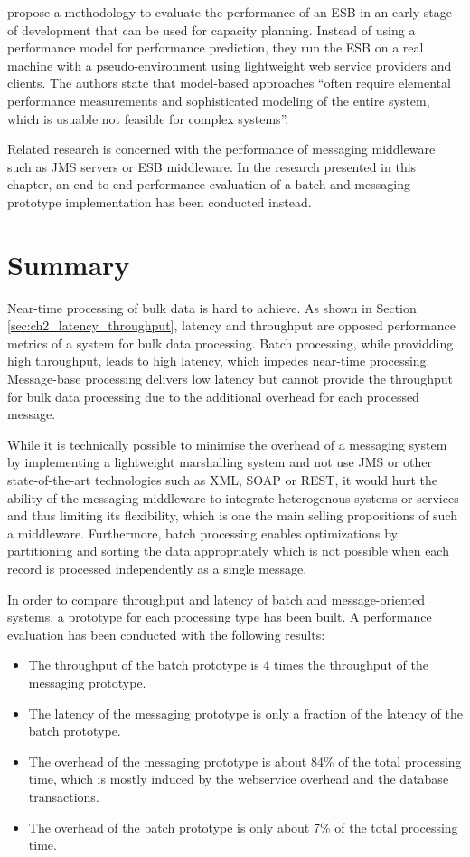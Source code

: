 \cite{Ueno:2006ly} propose a methodology to evaluate the performance of an ESB in an early stage of development that can be used for capacity planning. Instead of using a performance model for performance prediction, they run the ESB on a real machine with a pseudo-environment using lightweight web service providers and clients. The authors state that model-based approaches ``often require elemental performance measurements and sophisticated modeling of the entire system, which is usuable not feasible for complex systems''.

Related research is concerned with the performance of messaging middleware such as \ac{JMS} servers or \ac{ESB} middleware. In the research presented in this chapter, an end-to-end performance evaluation of a batch and messaging prototype implementation has been conducted instead.

\section{Summary}\label{sec:ch4_summary}
Near-time processing of bulk data is hard to achieve. As shown in Section \ref{sec:ch2_latency_throughput}, latency and throughput are opposed performance metrics of a system for bulk data processing. Batch processing, while providding high throughput, leads to high latency, which impedes near-time processing. Message-base processing delivers low latency but cannot provide the throughput for bulk data processing due to the additional overhead for each processed message.

While it is technically possible to minimise the overhead of a messaging system by implementing a lightweight marshalling system and not use JMS or other state-of-the-art technologies such as XML, SOAP or REST, it would hurt the ability of the messaging middleware to integrate heterogenous systems or services and thus limiting its flexibility, which is one the main selling propositions of such a middleware. Furthermore, batch processing enables optimizations by partitioning and sorting the data appropriately which is not possible when each record is processed independently as a single message.

In order to compare throughput and latency of batch and message-oriented systems, a prototype for each processing type has been built. A performance evaluation has been conducted with the following results:
\begin{itemize}
	\item The throughput of the batch prototype is 4 times the throughput of the messaging prototype.
	\item The latency of the messaging prototype is only a fraction of the latency of the batch prototype.
	\item The overhead of the messaging prototype is about 84\% of the total processing time, which is mostly induced by the webservice overhead and the database transactions. 
	\item The overhead of the batch prototype is only about 7\% of the total processing time.
\end{itemize}

